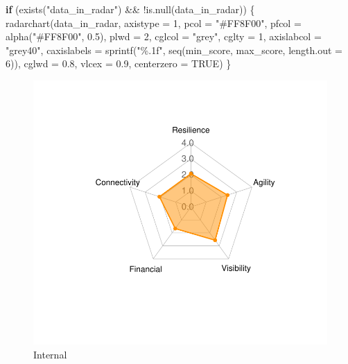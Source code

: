 \documentclass[
  letterpaper,
  DIV=11,
  numbers=noendperiod]{scrartcl}
\newenvironment{Shaded}{\begin{snugshade}}{\end{snugshade}}
\newcommand{\AttributeTok}[1]{\textcolor[rgb]{0.40,0.45,0.13}{#1}}
\newcommand{\ConstantTok}[1]{\textcolor[rgb]{0.56,0.35,0.01}{#1}}
\newcommand{\ControlFlowTok}[1]{\textcolor[rgb]{0.00,0.23,0.31}{\textbf{#1}}}
\newcommand{\DecValTok}[1]{\textcolor[rgb]{0.68,0.00,0.00}{#1}}
\newcommand{\FloatTok}[1]{\textcolor[rgb]{0.68,0.00,0.00}{#1}}
\newcommand{\FunctionTok}[1]{\textcolor[rgb]{0.28,0.35,0.67}{#1}}
\newcommand{\NormalTok}[1]{\textcolor[rgb]{0.00,0.23,0.31}{#1}}
\newcommand{\SpecialCharTok}[1]{\textcolor[rgb]{0.37,0.37,0.37}{#1}}
\newcommand{\StringTok}[1]{\textcolor[rgb]{0.13,0.47,0.30}{#1}}
\begin{document}
\begin{Shaded}
\begin{Highlighting}[]
\ControlFlowTok{if}\NormalTok{ (}\FunctionTok{exists}\NormalTok{(}\StringTok{"data\_in\_radar"}\NormalTok{) }\SpecialCharTok{\&\&} \SpecialCharTok{!}\FunctionTok{is.null}\NormalTok{(data\_in\_radar)) \{}
  \FunctionTok{radarchart}\NormalTok{(data\_in\_radar, }\AttributeTok{axistype =} \DecValTok{1}\NormalTok{, }
             \AttributeTok{pcol =} \StringTok{"\#FF8F00"}\NormalTok{, }\AttributeTok{pfcol =} \FunctionTok{alpha}\NormalTok{(}\StringTok{"\#FF8F00"}\NormalTok{, }\FloatTok{0.5}\NormalTok{), }\AttributeTok{plwd =} \DecValTok{2}\NormalTok{,}
             \AttributeTok{cglcol =} \StringTok{"grey"}\NormalTok{, }\AttributeTok{cglty =} \DecValTok{1}\NormalTok{, }\AttributeTok{axislabcol =} \StringTok{"grey40"}\NormalTok{, }
             \AttributeTok{caxislabels =} \FunctionTok{sprintf}\NormalTok{(}\StringTok{"\%.1f"}\NormalTok{, }\FunctionTok{seq}\NormalTok{(min\_score, max\_score, }\AttributeTok{length.out =} \DecValTok{6}\NormalTok{)), }
             \AttributeTok{cglwd =} \FloatTok{0.8}\NormalTok{, }\AttributeTok{vlcex =} \FloatTok{0.9}\NormalTok{, }\AttributeTok{centerzero =} \ConstantTok{TRUE}\NormalTok{)}
\NormalTok{\}}
\end{Highlighting}
\end{Shaded}

\begin{figure}[H]

{\centering \includegraphics[width=0.9\linewidth,height=\textheight,keepaspectratio]{example_3_files/figure-pdf/unnamed-chunk-2-1.pdf}

}

\caption{Internal}

\end{figure}%
\end{document}
